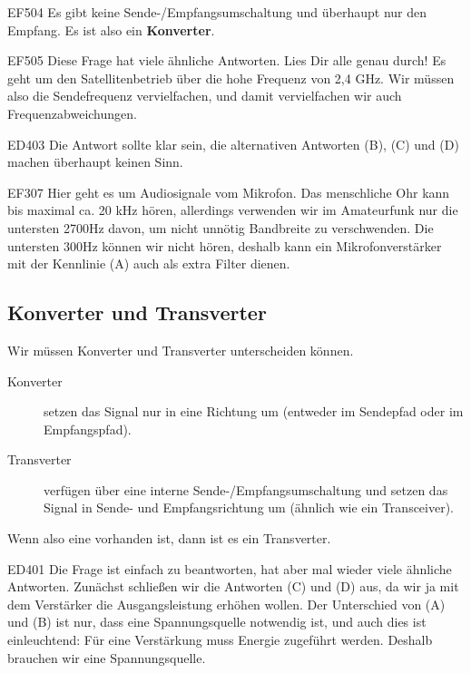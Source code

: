 \begin{sol}{EF504}
    Es gibt keine Sende-/Empfangsumschaltung und überhaupt nur den Empfang. Es ist also ein \textbf{Konverter}.
\end{sol}

\begin{sol}{EF505}
    Diese Frage hat viele ähnliche Antworten. Lies Dir alle genau durch!
    Es geht um den Satellitenbetrieb über die hohe Frequenz von 2,4 GHz. Wir müssen also die Sendefrequenz vervielfachen, und damit vervielfachen wir auch Frequenzabweichungen.
\end{sol}

\begin{sol}{ED403}
    Die Antwort sollte klar sein, die alternativen Antworten (B), (C) und (D) machen überhaupt keinen Sinn.
\end{sol}

\begin{sol}{EF307}
    Hier geht es um Audiosignale vom Mikrofon. Das menschliche Ohr kann bis maximal ca. 20 kHz hören, allerdings verwenden wir im Amateurfunk nur die untersten 2700Hz davon, um nicht unnötig Bandbreite zu verschwenden. Die untersten 300Hz können wir nicht hören, deshalb kann ein Mikrofonverstärker mit der Kennlinie (A) auch als extra Filter dienen.
\end{sol}

\subsection{Konverter und Transverter}
\begin{ohmchapter}
  Wir müssen Konverter und Transverter unterscheiden können.
  \begin{description}
  \item[Konverter] setzen das Signal nur in eine Richtung um (entweder im Sendepfad oder im Empfangspfad).
  \item[Transverter] verfügen über eine interne Sende-/Empfangsumschaltung und setzen das Signal in Sende- und Empfangsrichtung um (ähnlich wie ein Transceiver).
  \end{description} 
  Wenn also eine  vorhanden ist, dann ist es ein Transverter.
\end{ohmchapter}

\begin{sol}{ED401}
 Die Frage ist einfach zu beantworten, hat aber mal wieder viele ähnliche Antworten.
 Zunächst schließen wir die Antworten (C) und (D) aus, da wir ja mit dem Verstärker die Ausgangsleistung erhöhen wollen. Der Unterschied von (A) und (B) ist nur, dass eine Spannungsquelle notwendig ist, und auch dies ist einleuchtend: Für eine Verstärkung muss Energie zugeführt werden. Deshalb brauchen wir eine Spannungsquelle. 
\end{sol}

